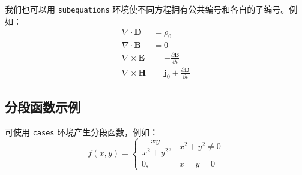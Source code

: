 \documentclass{article}
\begin{document}
我们也可以用 \verb|subequations| 环境使不同方程拥有公共编号和各自的子编号。例如：
\begin{subequations}
    \begin{align}
        \label{eq:Maxwell-Eqns-01}
        \nabla \cdot \mathbf{D} &= \rho_0 \\
        \label{eq:Maxwell-Eqns-02}
        \nabla \cdot \mathbf{B} &= 0 \\
        \label{eq:Maxwell-Eqns-03}
        \nabla \times \mathbf{E} &= -\frac{\partial \mathbf{B}}{\partial t} \\
        \label{eq:Maxwell-Eqns-04}
        \nabla \times \mathbf{H} &= \mathbf{j}_0 + \frac{\partial \mathbf{D}}{\partial t}
    \end{align}
\end{subequations}


\subsection{分段函数示例}

可使用 \verb|cases| 环境产生分段函数，例如：
\begin{equation}
    f(x,y)=
    \begin{cases}
    \dfrac{xy}{x^2+y^2}, & x^2+y^2 \neq 0 \\
    0, & x=y=0
    \end{cases}
\end{equation}


    
\end{document}
